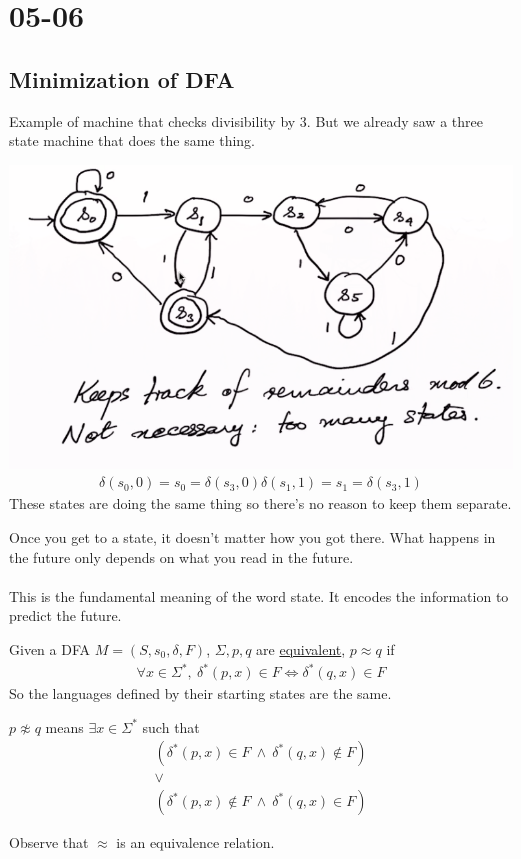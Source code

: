 \documentclass[../598comp.tex]{subfiles}
\date{05-06}
\begin{document}
\section{05-06}

\subsection{Minimization of DFA}

Example of machine that checks divisibility by 3. But we already saw a three state machine that does the same thing.

\includegraphics[width=\textwidth]{mod6machine}
\begin{gather*}
  \delta(s_0, 0) = s_0 = \delta(s_3, 0)
  \delta(s_1, 1) = s_1 = \delta(s_3, 1)
\end{gather*} 
These states are doing the same thing so there's no reason to keep them separate.
\begin{note}
  Once you get to a state, it doesn't matter how you got there. What happens in the future only depends on what you read in the future.
  \\\\
  This is the fundamental meaning of the word state. It encodes the information to predict the future.
\end{note} 
\begin{definition}
  Given a DFA $M = (S, s_0, \delta, F)$, $\Sigma, p, q$ are \ul{equivalent}, $p \approx q$ if 
  \begin{gather*}
    \forall x \in \Sigma^*, \ \delta^*(p, x) \in F \Leftrightarrow \delta^*(q, x) \in F
  \end{gather*} 
  So the languages defined by their starting states are the same.
  \begin{remark}
    $p \not\approx q$ means $\exists x \in \Sigma^*$ such that 
    \begin{gather*}
      (\delta^*(p, x) \in F \ \wedge \ \delta^*(q, x) \notin F) \\
      \vee
      \\
      (\delta^*(p, x) \notin F \ \wedge \ \delta^*(q, x) \in F)
    \end{gather*} 
  \end{remark} 
  Observe that $\approx$ is an equivalence relation.
\end{definition} 
\end{document}
